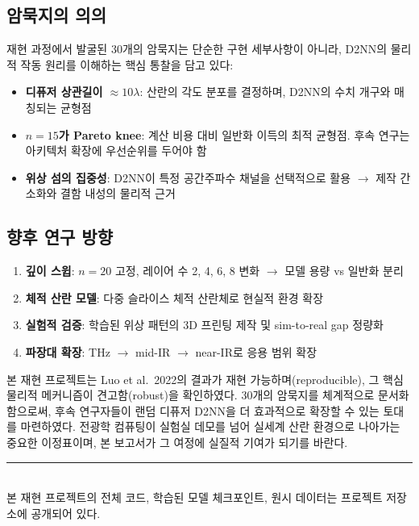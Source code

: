 \documentclass[11pt, a4paper]{article}
\begin{document}
\subsection{암묵지의 의의}

재현 과정에서 발굴된 30개의 암묵지는 단순한 구현 세부사항이 아니라, D2NN의 물리적 작동 원리를 이해하는 핵심 통찰을 담고 있다:

\begin{itemize}
  \item \textbf{디퓨저 상관길이 $\approx 10\lambda$}: 산란의 각도 분포를 결정하며, D2NN의 수치 개구와 매칭되는 균형점
  \item \textbf{$n = 15$가 Pareto knee}: 계산 비용 대비 일반화 이득의 최적 균형점. 후속 연구는 아키텍처 확장에 우선순위를 두어야 함
  \item \textbf{위상 섬의 집중성}: D2NN이 특정 공간주파수 채널을 선택적으로 활용 $\to$ 제작 간소화와 결함 내성의 물리적 근거
\end{itemize}

\subsection{향후 연구 방향}

\begin{enumerate}
  \item \textbf{깊이 스윕}: $n = 20$ 고정, 레이어 수 2, 4, 6, 8 변화 $\to$ 모델 용량 vs 일반화 분리
  \item \textbf{체적 산란 모델}: 다중 슬라이스 체적 산란체로 현실적 환경 확장
  \item \textbf{실험적 검증}: 학습된 위상 패턴의 3D 프린팅 제작 및 sim-to-real gap 정량화
  \item \textbf{파장대 확장}: THz $\to$ mid-IR $\to$ near-IR로 응용 범위 확장
\end{enumerate}

\vspace{1.5em}

\begin{insightbox}[결어]
본 재현 프로젝트는 Luo et al.\ 2022의 결과가 재현 가능하며(reproducible), 그 핵심 물리적 메커니즘이 견고함(robust)을 확인하였다. 30개의 암묵지를 체계적으로 문서화함으로써, 후속 연구자들이 랜덤 디퓨저 D2NN을 더 효과적으로 확장할 수 있는 토대를 마련하였다. 전광학 컴퓨팅이 실험실 데모를 넘어 실세계 산란 환경으로 나아가는 중요한 이정표이며, 본 보고서가 그 여정에 실질적 기여가 되기를 바란다.
\end{insightbox}

\vfill
\begin{center}
\textcolor{NatGray}{\rule{0.4\textwidth}{0.4pt}}\\[0.5em]
{\small\sffamily\color{NatGray} 본 재현 프로젝트의 전체 코드, 학습된 모델 체크포인트, 원시 데이터는 프로젝트 저장소에 공개되어 있다.}
\end{center}
\end{document}

